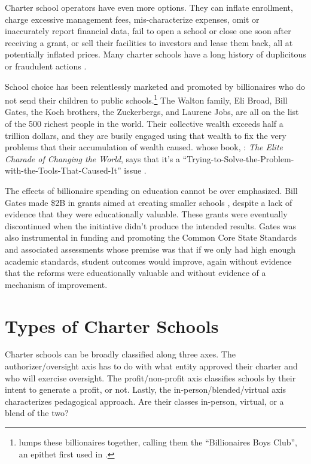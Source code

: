 Charter school operators have even more options. They can inflate enrollment, charge excessive management fees, mis-characterize expenses, omit or inaccurately report financial data, fail to open a school or close one soon after receiving a grant, or sell their facilities to investors and lease them back, all at potentially inflated prices. Many charter schools have a long history of duplicitous or fraudulent actions \parencite{ITPT2018, Burris.Bryant2020, Baker.Miron2015}.

School choice has been relentlessly marketed and promoted by billionaires who do not send their children to public schools.\footnote{\textcite{Ravitch2010} lumps these billionaires together, calling them the ``Billionaires  Boys Club'', an epithet first used in .} The Walton family, Eli Broad, Bill Gates, the Koch brothers, the Zuckerbergs, and Laurene Jobs, are all on the list of the 500 richest people in the world. Their collective wealth exceeds half a trillion dollars, and they are busily engaged using that wealth to fix the very problems that their accumulation of wealth caused. \textcite{Giridharadas2018} whose book, : \textit{The Elite Charade of Changing the World}, says that it's a ``Trying-to-Solve-the-Problem-with-the-Tools-That-Caused-It'' issue \parencite[142]{Giridharadas2018}.

The effects of billionaire spending on education cannot be over emphasized. Bill Gates made \$2B in grants aimed at creating smaller schools \parencite[11]{Gates2009}, despite a lack of evidence that they were educationally valuable. These grants were eventually discontinued when the initiative didn't produce the intended results. Gates was also instrumental in funding and promoting the Common Core State Standards and associated assessments whose premise was that if we only had high enough academic standards, student outcomes would improve, again without evidence that the reforms were educationally valuable and without evidence of a mechanism of improvement.

\section{Types of Charter Schools}\label{sec:types-charters}\indent

Charter schools can be broadly classified along three axes. The authorizer/oversight axis has to do with what entity approved their charter and who will exercise oversight. The profit/non-profit axis classifies schools by their intent to generate a profit, or not.
Lastly, the in-person/blended/virtual axis characterizes pedagogical approach. Are their classes in-person, virtual, or a blend of the two?

